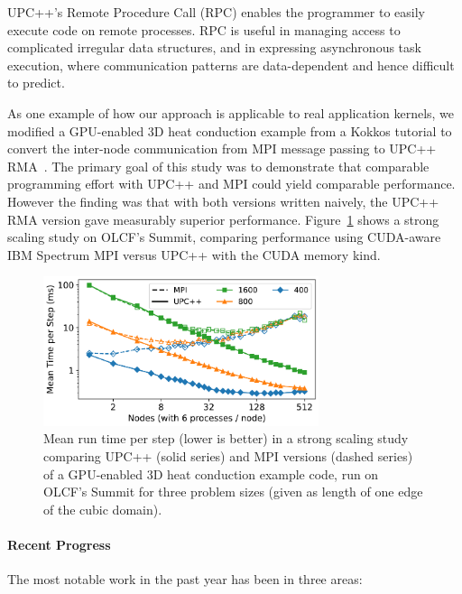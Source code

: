UPC++'s Remote Procedure Call (RPC)
enables the programmer
to easily execute code on remote processes.
RPC is useful in managing access to complicated irregular data structures,
and in expressing asynchronous task execution, where communication patterns
are data-dependent and hence difficult to predict.

As one example of how our approach is applicable to real application kernels,
we modified a GPU-enabled 3D heat conduction example from a Kokkos tutorial to
convert the inter-node communication from MPI message passing to UPC++
RMA~\cite{pawatm21-upcxx-kokkos}.  The primary goal of this study was to
demonstrate that comparable programming effort with UPC++ and MPI could yield
comparable performance. However the finding was that with both versions written
naively, the UPC++ RMA version gave measurably superior performance.
Figure~\ref{fig:paw21_interop_strong_scaling} shows a strong scaling study on
OLCF's Summit, comparing performance using 
CUDA-aware IBM Spectrum MPI versus UPC++ with the CUDA memory kind.

\begin{figure}[htb]
  \centering
  \captionsetup{width=0.85\linewidth}
  \includegraphics[width=0.72\textwidth]{projects/2.3.1-PMR/2.3.1.14-UPCxx-GASNet/paw21_interop_strong_scaling1.pdf}
  \caption{Mean run time per step (lower is better) in a strong scaling study
    comparing UPC++ (solid series) and MPI versions (dashed series) of a
    GPU-enabled 3D heat conduction example code, run on OLCF's Summit for three
    problem sizes (given as length of one edge of the cubic domain).}
  \label{fig:paw21_interop_strong_scaling}
\end{figure}


\paragraph{Recent Progress}

The most notable work in the past year has been in three areas:


